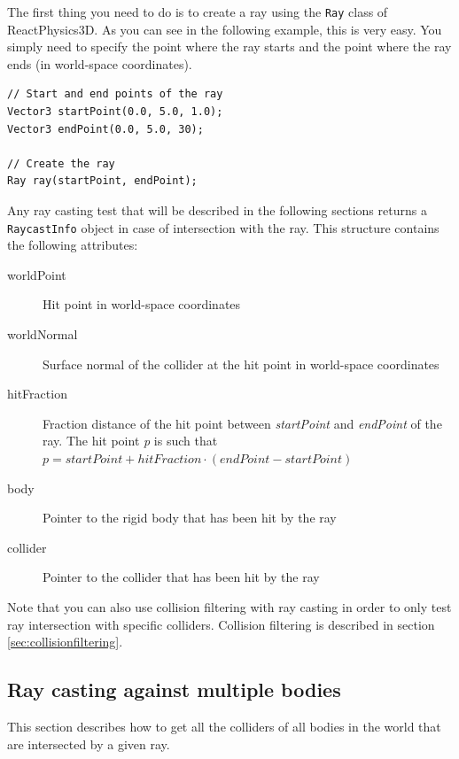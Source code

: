 \documentclass[a4paper,12pt]{article}
\begin{document}
    The first thing you need to do is to create a ray using the \texttt{Ray} class of ReactPhysics3D. As you can see in the following example, this is
    very easy. You simply need to specify the point where the ray starts and the point where the ray ends (in world-space coordinates). \\

    \begin{lstlisting}
// Start and end points of the ray
Vector3 startPoint(0.0, 5.0, 1.0);
Vector3 endPoint(0.0, 5.0, 30);

// Create the ray
Ray ray(startPoint, endPoint);
  \end{lstlisting}

    \vspace{0.6cm}

    Any ray casting test that will be described in the following sections returns a \texttt{RaycastInfo} object in case of intersection with the ray.
    This structure contains the following attributes: \\

    \begin{description}
         \item[worldPoint] Hit point in world-space coordinates
         \item[worldNormal] Surface normal of the collider at the hit point in world-space coordinates
         \item[hitFraction] Fraction distance of the hit point between \emph{startPoint}  and \emph{endPoint} of the ray. The hit point \emph{p} is such that
           $p = startPoint + hitFraction \cdot (endPoint - startPoint)$
         \item[body] Pointer to the rigid body that has been hit by the ray
         \item[collider] Pointer to the collider that has been hit by the ray
    \end{description}

    Note that you can also use collision filtering with ray casting in order to only test ray intersection with specific colliders.
    Collision filtering is described in section \ref{sec:collisionfiltering}.

    \subsection{Ray casting against multiple bodies}

    This section describes how to get all the colliders of all bodies in the world that are intersected by a given ray.
\end{document}
